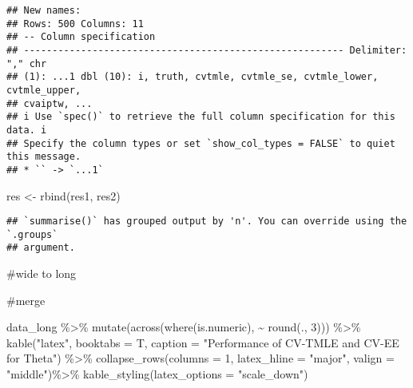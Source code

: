 \documentclass[
]{article}
\newenvironment{Shaded}{\begin{snugshade}}{\end{snugshade}}
\newcommand{\AttributeTok}[1]{\textcolor[rgb]{0.77,0.63,0.00}{#1}}
\newcommand{\DecValTok}[1]{\textcolor[rgb]{0.00,0.00,0.81}{#1}}
\newcommand{\FunctionTok}[1]{\textcolor[rgb]{0.00,0.00,0.00}{#1}}
\newcommand{\NormalTok}[1]{#1}
\newcommand{\OtherTok}[1]{\textcolor[rgb]{0.56,0.35,0.01}{#1}}
\newcommand{\SpecialCharTok}[1]{\textcolor[rgb]{0.00,0.00,0.00}{#1}}
\newcommand{\StringTok}[1]{\textcolor[rgb]{0.31,0.60,0.02}{#1}}
\begin{document}
\begin{verbatim}
## New names:
## Rows: 500 Columns: 11
## -- Column specification
## -------------------------------------------------------- Delimiter: "," chr
## (1): ...1 dbl (10): i, truth, cvtmle, cvtmle_se, cvtmle_lower, cvtmle_upper,
## cvaiptw, ...
## i Use `spec()` to retrieve the full column specification for this data. i
## Specify the column types or set `show_col_types = FALSE` to quiet this message.
## * `` -> `...1`
\end{verbatim}

\begin{Shaded}
\begin{Highlighting}[]
\NormalTok{res }\OtherTok{\textless{}{-}} \FunctionTok{rbind}\NormalTok{(res1, res2)}
\end{Highlighting}
\end{Shaded}

\begin{verbatim}
## `summarise()` has grouped output by 'n'. You can override using the `.groups`
## argument.
\end{verbatim}

\#wide to long

\#merge

\newpage

\begin{Shaded}
\begin{Highlighting}[]
\NormalTok{data\_long }\SpecialCharTok{\%\textgreater{}\%} 
  \FunctionTok{mutate}\NormalTok{(}\FunctionTok{across}\NormalTok{(}\FunctionTok{where}\NormalTok{(is.numeric), }\SpecialCharTok{\textasciitilde{}} \FunctionTok{round}\NormalTok{(., }\DecValTok{3}\NormalTok{))) }\SpecialCharTok{\%\textgreater{}\%} 
  \FunctionTok{kable}\NormalTok{(}\StringTok{"latex"}\NormalTok{, }\AttributeTok{booktabs =}\NormalTok{ T, }\AttributeTok{caption =} \StringTok{"Performance of CV{-}TMLE and CV{-}EE for Theta"}\NormalTok{) }\SpecialCharTok{\%\textgreater{}\%} 
  \FunctionTok{collapse\_rows}\NormalTok{(}\AttributeTok{columns =} \DecValTok{1}\NormalTok{, }\AttributeTok{latex\_hline =} \StringTok{"major"}\NormalTok{, }\AttributeTok{valign =} \StringTok{"middle"}\NormalTok{)}\SpecialCharTok{\%\textgreater{}\%}
  \FunctionTok{kable\_styling}\NormalTok{(}\AttributeTok{latex\_options =} \StringTok{"scale\_down"}\NormalTok{)}
\end{Highlighting}
\end{Shaded}
\end{document}
